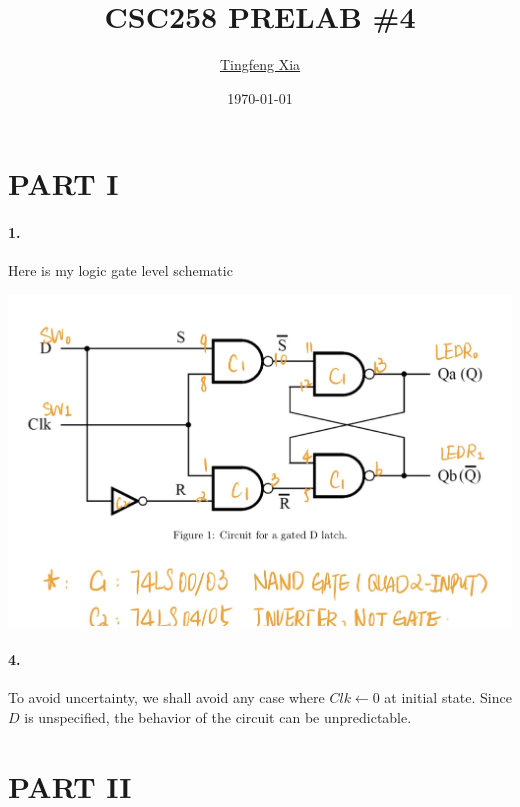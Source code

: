 \documentclass[oneside, 10pt]{article}
\title{\LARGE CSC258 PRELAB \#4}
\author{\href{https://tingfengx.github.io}{Tingfeng Xia}}
\date{\today}
\begin{document}
\maketitle
\section*{PART I}
\paragraph{1.} Here is my logic gate level schematic
\begin{center}
    \includegraphics[scale=0.21]{q1_scheme.jpg}
\end{center}
\paragraph{4.} To avoid uncertainty, we shall avoid any case where $Clk\gets 0$ 
at initial state. Since $D$ is unspecified, the behavior of the circuit can be 
unpredictable. 

\section*{PART II}
\end{document}

